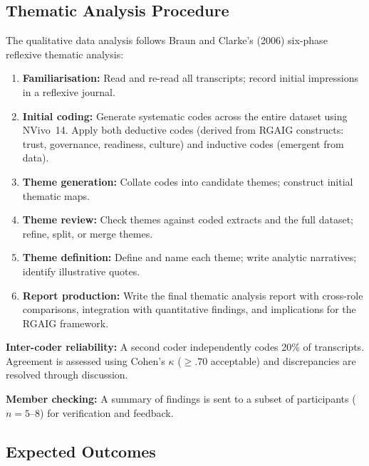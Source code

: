 \subsection{Thematic Analysis Procedure}

The qualitative data analysis follows Braun and Clarke's (2006) six-phase reflexive thematic analysis:

\begin{enumerate}
    \item \textbf{Familiarisation:} Read and re-read all transcripts; record initial impressions in a reflexive journal.
    \item \textbf{Initial coding:} Generate systematic codes across the entire dataset using NVivo~14. Apply both deductive codes (derived from RGAIG constructs: trust, governance, readiness, culture) and inductive codes (emergent from data).
    \item \textbf{Theme generation:} Collate codes into candidate themes; construct initial thematic maps.
    \item \textbf{Theme review:} Check themes against coded extracts and the full dataset; refine, split, or merge themes.
    \item \textbf{Theme definition:} Define and name each theme; write analytic narratives; identify illustrative quotes.
    \item \textbf{Report production:} Write the final thematic analysis report with cross-role comparisons, integration with quantitative findings, and implications for the RGAIG framework.
\end{enumerate}

\noindent \textbf{Inter-coder reliability:} A second coder independently codes 20\% of transcripts. Agreement is assessed using Cohen's $\kappa$ ($\geq .70$ acceptable) and discrepancies are resolved through discussion.

\noindent \textbf{Member checking:} A summary of findings is sent to a subset of participants ($n = 5$--$8$) for verification and feedback.

\subsection{Expected Outcomes}

